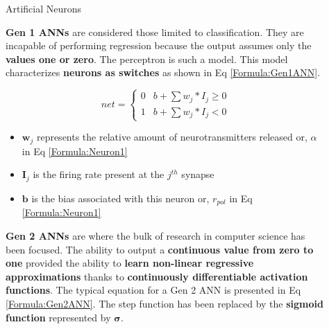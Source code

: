 \documentclass[final]{beamer}
\newlength{\sepwidth}
\newlength{\colwidth}
\newcommand{\separatorcolumn}{\begin{column}{\sepwidth}\end{column}}
\begin{document}
\begin{frame}[t]
\begin{columns}[t]
\begin{column}{\colwidth}

\end{column}

\separatorcolumn

\begin{column}{\colwidth}

  \begin{block}{Artificial Neurons}

    \textbf{Gen 1 ANNs} are considered those limited to classification. They are incapable of performing regression because the output assumes only the \textbf{values one or zero}. The perceptron is such a model. This model characterizes \textbf{neurons as switches} as shown in Eq \ref{Formula:Gen1ANN}.


    \begin{equation}
      \label{Formula:Gen1ANN}
      net = \begin{cases} 
        0 & b + \sum w_{j}*I_{j} \geq 0 \\
        1 & b + \sum w_{j}*I_{j} < 0
        \end{cases}
    \end{equation}

    \begin{itemize}
      \item $\boldsymbol w_{j}$ represents the relative amount of neurotransmitters released or, $\alpha$ in Eq \ref{Formula:Neuron1}
      \item $\boldsymbol I_{j}$ is the firing rate present at the $j^{th}$ synapse 
      \item $\boldsymbol b$ is the bias associated with this neuron or, $r_{pol}$ in Eq \ref{Formula:Neuron1}
    \end{itemize}

    \textbf{Gen 2 ANNs} are where the bulk of research in computer science has been focused. The ability to output a \textbf{continuous value from zero to one} provided the ability to \textbf{learn non-linear regressive approximations} thanks to \textbf{continuously differentiable activation functions}. The typical equation for a Gen 2 ANN is presented in Eq \ref{Formula:Gen2ANN}. The step function has been replaced by the \textbf{sigmoid function} represented by $\boldsymbol \sigma$. 


\end{block}
\end{column}
\end{columns}
\end{frame}
\end{document}
